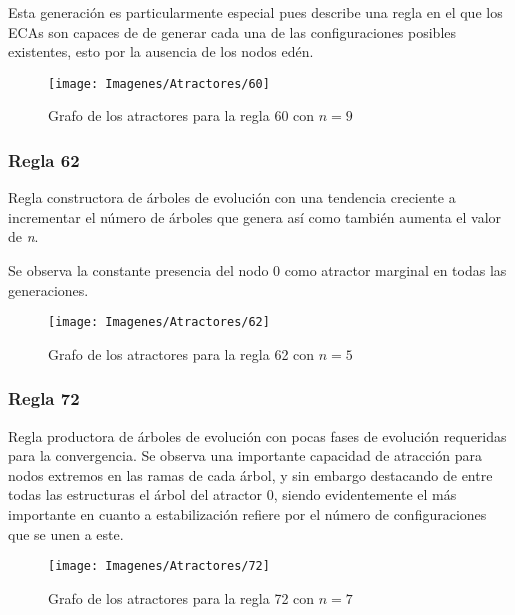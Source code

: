 \documentclass[]{article}
\begin{document}
				\hfill\break
				\justifying
				Esta generación es particularmente especial pues describe una regla en el que los ECAs son capaces de de generar cada una de las configuraciones posibles existentes, esto por la ausencia de los nodos edén.
				
				\begin{figure}[!h]
					\centering
					\texttt{[image: Imagenes/Atractores/60]}
					\caption{Grafo de los atractores para la regla 60 con $n=9$}
					\label{Regla_60}
				\end{figure}
			
			\newpage
			\subsubsection{Regla 62}
				\justifying
				Regla constructora de árboles de evolución con una tendencia creciente a incrementar el número de árboles que genera así como también aumenta el valor de \textit{n}.
				
				\hfill\break
				\justifying
				Se observa la constante presencia del nodo 0 como atractor marginal en todas las generaciones.
				
				\hfill\break
				\hfill\break
				\begin{figure}[!h]
					\centering
					\texttt{[image: Imagenes/Atractores/62]}
					\caption{Grafo de los atractores para la regla 62 con $n=5$}
					\label{Regla_62}
				\end{figure}
			
			\newpage
			\subsubsection{Regla 72}
				\justifying
				Regla productora de árboles de evolución con pocas fases de evolución requeridas para la convergencia. Se observa una importante capacidad de atracción para nodos extremos en las ramas de cada árbol, y sin embargo destacando de entre todas las estructuras el árbol del atractor 0, siendo evidentemente el más importante en cuanto a estabilización refiere por el número de configuraciones que se unen a este.
				
				\hfill\break
				\hfill\break
				\begin{figure}[!h]
					\centering
					\texttt{[image: Imagenes/Atractores/72]}
					\caption{Grafo de los atractores para la regla 72 con $n=7$}
					\label{Regla_72}
				\end{figure}
			
\end{document}
